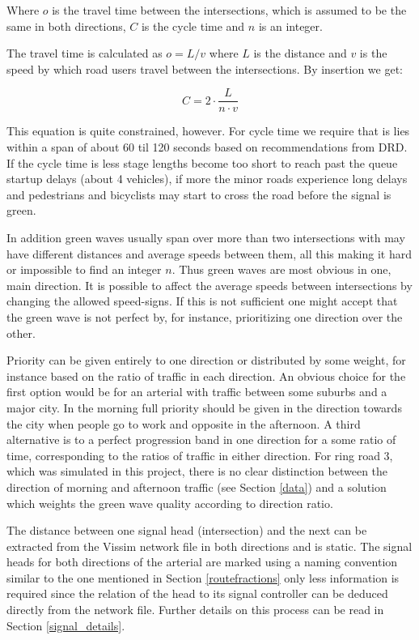 Where $o$ is the travel time between the intersections, which is assumed to be the same in both directions, $C$ is the cycle time and $n$ is an integer.

The travel time is calculated as $o = L / v$ where $L$ is the distance and $v$ is the speed by which road users travel between the intersections. By insertion we get:

$$C = 2 \cdot \frac{L}{n \cdot v}$$

This equation is quite constrained, however. For cycle time we require that is lies within a span of about 60 til 120 seconds based on recommendations from DRD. If the cycle time is less stage lengths become too short to reach past the queue startup delays (about 4 vehicles), if more the minor roads experience long delays and pedestrians and bicyclists may start to cross the road before the signal is green.

In addition green waves usually span over more than two intersections with may have different distances and average speeds between them, all this making it hard or impossible to find an integer $n$. Thus green waves are most obvious in one, main direction. It is possible to affect the average speeds between intersections by changing the allowed speed-signs. If this is not sufficient one might accept that the green wave is not perfect by, for instance, prioritizing one direction over the other.

Priority can be given entirely to one direction or distributed by some weight, for instance based on the ratio of traffic in each direction. An obvious choice for the first option would be for an arterial with traffic between some suburbs and a major city. In the morning full priority should be given in the direction towards the city when people go to work and opposite in the afternoon. A third alternative is to a perfect progression band in one direction for a some ratio of time, corresponding to the ratios of traffic in either direction.
For ring road 3, which was simulated in this project, there is no clear distinction between the direction of morning and afternoon traffic (see Section \ref{data}) and a solution which weights the green wave quality according to direction ratio. 

The distance between one signal head (intersection) and the next can be extracted from the Vissim network file in both directions and is static. The signal heads for both directions of the arterial are marked using a naming convention similar to the one mentioned in Section \ref{routefractions} only less information is required since the relation of the head to its signal controller can be deduced directly from the network file. Further details on this process can be read in Section \ref{signal_details}.

